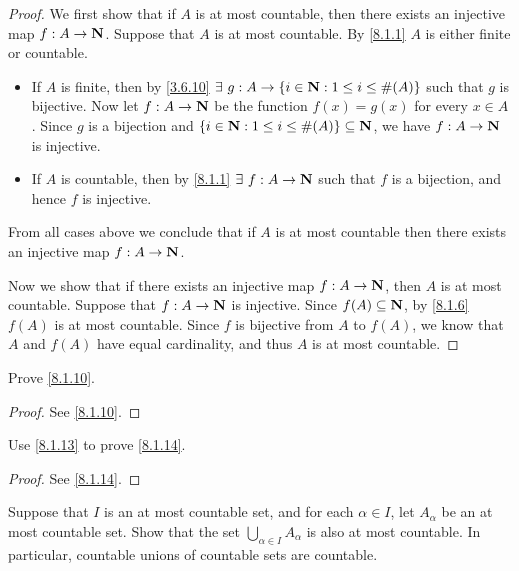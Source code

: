 \begin{proof}
  We first show that if \(A\) is at most countable, then there exists an injective map \(f : A \to \mathbf{N}\).
  Suppose that \(A\) is at most countable.
  By \cref{8.1.1} \(A\) is either finite or countable.
  \begin{itemize}
    \item If \(A\) is finite, then by \cref{3.6.10} \(\exists\ g : A \to \{i \in \N : 1 \leq i \leq \#(A)\}\) such that \(g\) is bijective.
          Now let \(f : A \to \mathbf{N}\) be the function \(f(x) = g(x)\) for every \(x \in A\).
          Since \(g\) is a bijection and \(\{i \in \mathbf{N} : 1 \leq i \leq \#(A)\} \subseteq \mathbf{N}\), we have \(f : A \to \mathbf{N}\) is injective.
    \item If \(A\) is countable, then by \cref{8.1.1} \(\exists\ f : A \to \mathbf{N}\) such that \(f\) is a bijection, and hence \(f\) is injective.
  \end{itemize}
  From all cases above we conclude that if \(A\) is at most countable then there exists an injective map \(f : A \to \mathbf{N}\).

  Now we show that if there exists an injective map \(f : A \to \mathbf{N}\), then \(A\) is at most countable.
  Suppose that \(f : A \to \mathbf{N}\) is injective.
  Since \(f(A) \subseteq \mathbf{N}\), by \cref{8.1.6} \(f(A)\) is at most countable.
  Since \(f\) is bijective from \(A\) to \(f(A)\), we know that \(A\) and \(f(A)\) have equal cardinality, and thus \(A\) is at most countable.
\end{proof}

\begin{exercise}\label{ex 8.1.7}
  Prove \cref{8.1.10}.
\end{exercise}

\begin{proof}
  See \cref{8.1.10}.
\end{proof}

\begin{exercise}\label{ex 8.1.8}
  Use \cref{8.1.13} to prove \cref{8.1.14}.
\end{exercise}

\begin{proof}
  See \cref{8.1.14}.
\end{proof}

\begin{exercise}\label{ex 8.1.9}
  Suppose that \(I\) is an at most countable set, and for each \(\alpha \in I\), let \(A_{\alpha}\) be an at most countable set.
  Show that the set \(\bigcup_{\alpha \in I} A_{\alpha}\) is also at most countable.
  In particular, countable unions of countable sets are countable.
\end{exercise}


